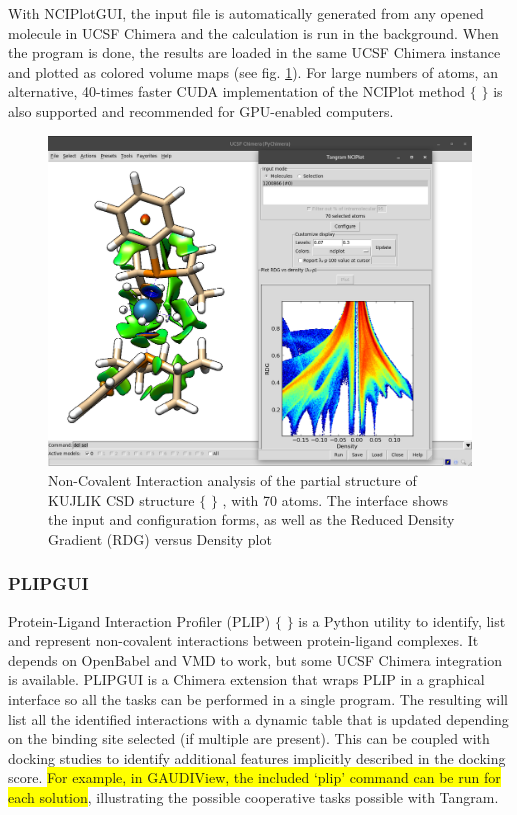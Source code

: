 With NCIPlotGUI, the input file is automatically generated from any opened molecule in UCSF Chimera and the calculation is run in the background. When the program is done, the results are loaded in the same UCSF Chimera instance and plotted as colored volume maps (see fig. \ref{fig:tangram-nciplot}). For large numbers of atoms, an alternative, 40-times faster CUDA implementation of the NCIPlot method $ \{ $ $ \} $  is also supported and recommended for GPU-enabled computers.





\begin{figure}[H]
	\begin{Center}
		\includegraphics[width=\textwidth]{./figures/05/tangram_nciplot.png}
		\caption[Tangram NCIPlotGUI]{Non-Covalent Interaction analysis of the partial structure of KUJLIK CSD structure $ \{ $ $ \} $ , with 70 atoms. The interface shows the input and configuration forms, as well as the Reduced Density Gradient (RDG) versus Density plot}
		\label{fig:tangram-nciplot}
	\end{Center}
\end{figure}

\subsubsection{PLIPGUI}
Protein-Ligand Interaction Profiler (PLIP) $ \{ $ $ \} $  is a Python utility to identify, list and represent non-covalent interactions between protein-ligand complexes. It depends on OpenBabel and VMD to work, but some UCSF Chimera integration is available. PLIPGUI is a Chimera extension that wraps PLIP in a graphical interface so all the tasks can be performed in a single program. The resulting will list all the identified interactions with a dynamic table that is updated depending on the binding site selected (if multiple are present). This can be coupled with docking studies to identify additional features implicitly described in the docking score. \colorbox{yellow}{For example, in GAUDIView, the included ‘plip’ command can be run for each solution}, illustrating the possible cooperative tasks possible with Tangram.

